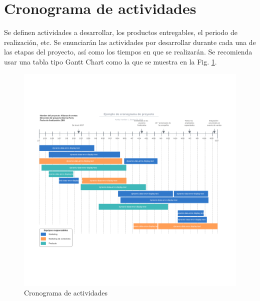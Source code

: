 \documentclass[letterpaper,12pt,oneside]{article}
\begin{document}
\section{Cronograma de actividades} 
Se definen actividades a desarrollar, los productos entregables, el periodo de realización, etc. Se enunciarán las actividades por desarrollar durante cada una de las etapas del proyecto, así como los tiempos en que se realizarán. Se recomienda usar una tabla tipo Gantt Chart como la que se muestra en la Fig. \ref{fig:cron}.

\begin{figure}[h]
    \centering
    \includegraphics[scale=0.4]{cronograma.png} %
    \caption{Cronograma de actividades}
    \label{fig:cron}
\end{figure}

\clearpage
\end{document}
